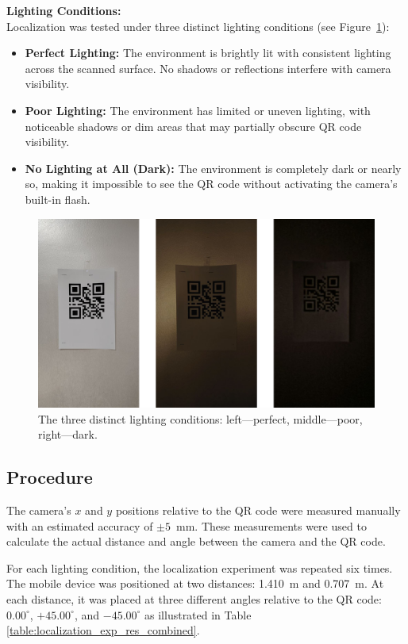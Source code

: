 \textbf{Lighting Conditions:}\\
Localization was tested under three distinct lighting conditions (see Figure~\ref{Localization-Experiment-Lighting-Conditions}):
\begin{itemize}
	\item \textbf{Perfect Lighting:} The environment is brightly lit with consistent lighting across the scanned surface. No shadows or reflections interfere with camera visibility.
	
	\item \textbf{Poor Lighting:} The environment has limited or uneven lighting, with noticeable shadows or dim areas that may partially obscure QR code visibility.
	
	\item \textbf{No Lighting at All (Dark):} The environment is completely dark or nearly so, making it impossible to see the QR code without activating the camera's built-in flash.
\end{itemize}


\begin{figure}[h!]
	\centering
	\includegraphics[width=0.7\linewidth]{assets/ch4/Three lighting conditions/Three lighting conditions.png}
	\caption{The three distinct lighting conditions: left—perfect, middle—poor, right—dark.}
	\label{Localization-Experiment-Lighting-Conditions}
\end{figure}


\subsection{Procedure}\label{sec:procedure}

The camera's $x$ and $y$ positions relative to the QR code were measured manually with an estimated accuracy of $\pm5$~mm. These measurements were used to calculate the actual distance and angle between the camera and the QR code.

For each lighting condition, the localization experiment was repeated six times. The mobile device was positioned at two distances: 1.410~m and 0.707~m. At each distance, it was placed at three different angles relative to the QR code: $0.00^\circ$, $+45.00^\circ$, and $-45.00^\circ$ as illustrated in Table \ref{table:localization_exp_res_combined}.


